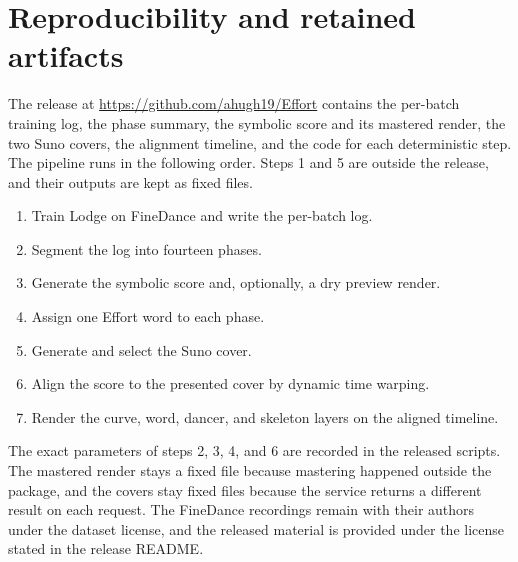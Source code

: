 \section{Reproducibility and retained artifacts}

The release at \url{https://github.com/ahugh19/Effort} contains the per-batch training log, the phase summary, the symbolic score and its mastered render, the two Suno covers, the alignment timeline, and the code for each deterministic step.
The pipeline runs in the following order. Steps 1 and 5 are outside the release, and their outputs are kept as fixed files.
\begin{enumerate}
\item Train Lodge on FineDance and write the per-batch log.
\item Segment the log into fourteen phases.
\item Generate the symbolic score and, optionally, a dry preview render.
\item Assign one Effort word to each phase.
\item Generate and select the Suno cover.
\item Align the score to the presented cover by dynamic time warping.
\item Render the curve, word, dancer, and skeleton layers on the aligned timeline.
\end{enumerate}
The exact parameters of steps 2, 3, 4, and 6 are recorded in the released scripts.
The mastered render stays a fixed file because mastering happened outside the package, and the covers stay fixed files because the service returns a different result on each request.
The FineDance recordings remain with their authors \citep{li2023finedance} under the dataset license, and the released material is provided under the license stated in the release README.